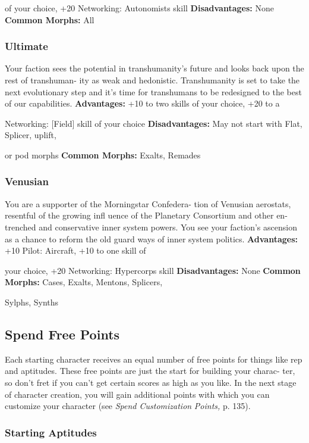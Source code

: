 of your choice, +20 Networking: Autonomists skill
\textbf{Disadvantages:} None
\textbf{Common Morphs:} All

\subsubsection{Ultimate}

Your faction sees the potential in transhumanity's 
future and looks back upon the rest of transhuman-
ity as weak and hedonistic. Transhumanity is set 
to take the next evolutionary step and it's time for 
transhumans to be redesigned to the best of our 
capabilities.
\textbf{Advantages:} +10 to two skills of your choice, +20 to a 

Networking: [Field] skill of your choice
\textbf{Disadvantages:} May not start with Flat, Splicer, uplift, 

or pod morphs
\textbf{Common Morphs: }Exalts, Remades

\subsubsection{Venusian}

You are a supporter of the Morningstar Confedera-
tion of Venusian aerostats, resentful of the growing 
infl uence of the Planetary Consortium and other en-
trenched and conservative inner system powers. You 
see your faction's ascension as a chance to reform the 
old guard ways of inner system politics.
\textbf{Advantages:} +10 Pilot: Aircraft, +10 to one skill of 

your choice, +20 Networking: Hypercorps skill
\textbf{Disadvantages:} None
\textbf{Common Morphs:} Cases, Exalts, Mentons, Splicers, 

Sylphs, Synths

\subsection{Spend Free Points}

Each starting character receives an equal number of 
free points for things like rep and aptitudes. These 
free points are just the start for building your charac-
ter, so don't fret if you can't get certain scores as high 
as you like. In the next stage of character creation, 
you will gain additional points with which you can 
customize your character (see \textit{Spend Customization }
\textit{Points,} p. 135).

\subsubsection{Starting Aptitudes}


